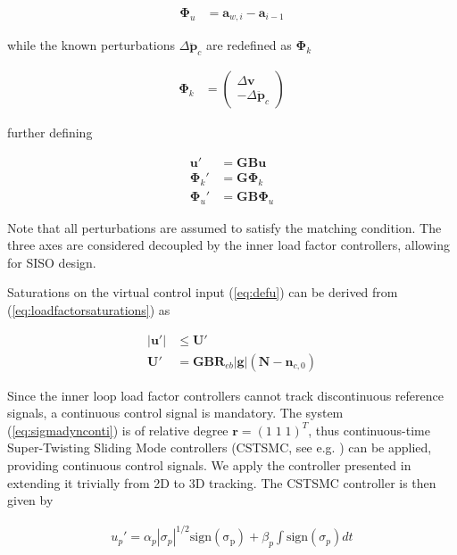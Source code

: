 \documentclass{ifacconf}
\providecommand{\mbf}[1]{\mathbf{#1}}
\newcommand{\idxFollower}{{\ensuremath{i} }}
\newcommand{\idxPredecessor}{{\ensuremath{i-1} }}
\newcommand{\idxAxis}{{\ensuremath{p}}}
\begin{document}
\begin{align}
\mbf{\Phi}_u &= \mbf{a}_{w,\idxFollower} - \mbf{a}_\idxPredecessor
\end{align}

while the known perturbations $\Delta \ddot{\mbf{p}}_c$ are redefined as $\mbf{\Phi}_k$

\begin{align}
\mbf{\Phi}_k &= 
\begin{pmatrix}
\Delta \mbf{v} \\
 - \Delta \ddot{\mbf{p}}_c
\end{pmatrix} 
\end{align}

further defining

\begin{align}
\mbf{u}' &= \mbf{GB}\mbf{u}
\label{eq:defu}\\
\mbf{\Phi}_k' &= \mbf{G}\mbf{\Phi}_k \\
\mbf{\Phi}_u' &= \mbf{GB}\mbf{\Phi}_u
\end{align}

Note that all perturbations are assumed to satisfy the matching condition.
The three axes are considered decoupled by the inner load factor controllers, allowing for SISO design.

Saturations on the virtual control input (\ref{eq:defu}) can be derived from (\ref{eq:loadfactorsaturations}) as

\begin{align}
|\mbf{u}'| &\leq \mbf{U}' \\
\mbf{U}' &= \mbf{GB} \mbf{R}_{eb} |\mbf{g}|(\mbf{N}-\mbf{n}_{c,0})
\end{align}

Since the inner loop load factor controllers cannot track discontinuous reference signals, a continuous control signal is mandatory.
The system (\ref{eq:sigmadynconti}) is of relative degree $\mbf{r} = (1 \; 1 \; 1)^T$, thus continuous-time Super-Twisting Sliding Mode controllers (CSTSMC, see e.g. \cite{shtessel2014sliding}) can be applied, providing continuous control signals.
We apply the controller presented in \cite{galzi2006uav} extending it trivially from 2D to 3D tracking.
The CSTSMC controller is then given by

\begin{align}
u_\idxAxis' = \alpha_\idxAxis |\sigma_\idxAxis|^{1/2}\mathrm{sign(\sigma_\idxAxis)} + \beta_\idxAxis \int \mathrm{sign}(\sigma_\idxAxis) dt
\end{align}
\end{document}
